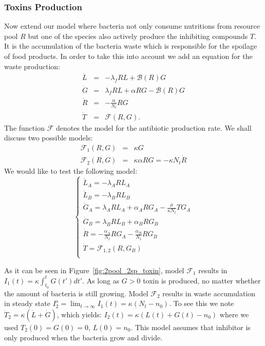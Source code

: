 \documentclass[10pt,A4paper]{article}
\begin{document}

\subsubsection{Toxins Production}
Now extend our model where bacteria not only consume nutritions from resource pool $R$ but one of the species also actively produce the inhibiting compounds $T$. 
It is the accumulation of the bacteria waste which is responsible for the spoilage of food products. 
In order to take this into account we add an equation for the waste production:
\begin{eqnarray}
\dot{L} &=& - \lambda_f R L + \mathcal{B}(R)G\\
\dot{G} &=& \lambda_f R L +\alpha R G-\mathcal{B}(R)G\\
\dot{R} &=&-\frac{\alpha}{N_t} R G\\
\dot{T} &=& \mathcal{F}(R,G).
\end{eqnarray}
The function $\mathcal{F}$ denotes the model for the antibiotic production rate. 
We shall discuss two possible models:
\begin{eqnarray}
\mathcal{F}_1(R,G)&=&\kappa G\\
\mathcal{F}_2(R,G)&=&\kappa\alpha R G=-\kappa N_t\dot{R}
\end{eqnarray}
We would like to test the following model:
\begin{equation}
    \begin{cases}
        \dot{L}_A = - \lambda_A R L_A\\
        \dot{L}_B = - \lambda_B R L_B \\
        \dot{G}_A = \lambda_A R L_A + \alpha_A R G_A - \frac{\mu}{\kappa N_t} T G_A\\
        \dot{G}_B = \lambda_B R L_B + \alpha_B R G_B\\
        \dot{R} = -\frac{\alpha_A}{N_t} R G_A-\frac{\alpha_B}{N_t} R G_B\\
        \dot{T} = \mathcal{F}_{1,2} (R, G_B) \\
    \end{cases}
    \label{eq:model_2sp_toxin}
\end{equation}

As it can be seen in Figure~\ref{fig:2pool_2sp_toxin}, model $\mathcal{F}_1$ results in $I_1(t)=\kappa\int_{t_0}^tG(t')dt'$. 
As long as $G>0$ toxin is produced, no matter whether the amount of bacteria is still growing. 
Model $\mathcal{F}_2$ results in waste accumulation in steady state $I_2^s=\lim_{t\to\infty}I_1(t)=\kappa(N_t-n_0)$. 
To see this we note $\dot{T}_2=\kappa(\dot{L}+\dot{G})$, which yields: $I_2(t)=\kappa(L(t)+G(t)-n_0)$ where we used $T_2(0)=G(0)=0$, $L(0)=n_0$. 
This model assumes that inhibitor is only produced when the bacteria grow and divide. \\
\end{document}
